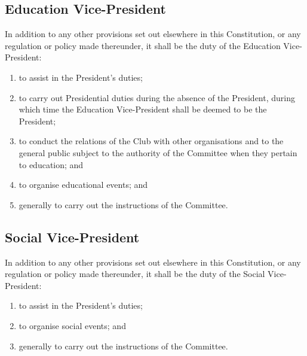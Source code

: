 \documentclass[11pt]{article} %
\begin{document}
{\color{ForestGreen} \subsection{Education Vice-President}
In addition to any other provisions set out elsewhere in this Constitution, or any regulation or policy made thereunder, it shall be the duty of the Education Vice-President:
\begin{enumerate}
	\item to assist in the President's duties;
	\item to carry out Presidential duties during the absence of the President, during which time the Education Vice-President shall be deemed to be the President;
	\item to conduct the relations of the Club with other organisations and to the general public subject to the authority of the Committee when they pertain to education; and
	\item to organise educational events; and
	\item generally to carry out the instructions of the Committee.
\end{enumerate}}

{\color{ForestGreen} \subsection{Social Vice-President}
In addition to any other provisions set out elsewhere in this Constitution, or any regulation or policy made thereunder, it shall be the duty of the Social Vice-President:
\begin{enumerate}
	\item to assist in the President's duties;
	\item to organise social events; and
	\item generally to carry out the instructions of the Committee.
\end{enumerate}}
\end{document}
